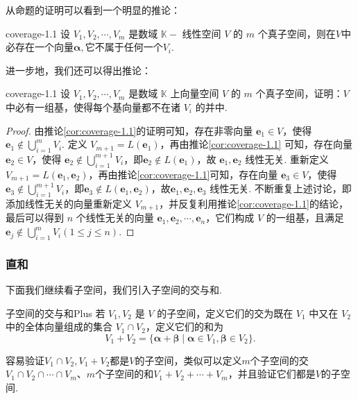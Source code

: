 \documentclass[12pt, a4paper,newtx]{ctexart}
\begin{document}
从命题的证明可以看到一个明显的推论：
\begin{corollary}{}{coverage-1.1}
	设 $V_1, V_2, \cdots, V_m$ 是数域 $\mathbb{K}-$ 线性空间 $V$ 的 $m$ 个真子空间，则在$V$中必存在一个向量$\bm\alpha,$它不属于任何一个$V_i.$
\end{corollary}
进一步地，我们还可以得出推论：\begin{corollary}{}{coverage-1.1}
	设 $V_1, V_2, \cdots, V_m$ 是数域 $\mathbb{K}$ 上向量空间 $V$ 的 $m$ 个真子空间，证明：$V$ 中必有一组基，使得每个基向量都不在诸 $V_i$ 的并中. 
\end{corollary}
\begin{proof}
	由推论\ref{cor:coverage-1.1}的证明可知，存在非零向量 $\bm e_1 \in V$，使得 $\displaystyle \bm e_1 \notin \bigcup_{i=1}^{m} V_i$. 定义 $V_{m+1} = L(\bm e_1)$，再由推论\ref{cor:coverage-1.1} 可知，存在向量 $\bm e_2 \in V$，使得 $\displaystyle \bm e_2 \notin \bigcup_{i=1}^{m+1} V_i$，即$\bm e_2 \notin L(\bm e_1)$，故 $\bm e_1, \bm e_2$ 线性无关. 重新定义 $V_{m+1} = L(\bm e_1, \bm e_2)$，再由推论\ref{cor:coverage-1.1}可知，存在向量 $\bm e_3 \in V$，使得 $\displaystyle \bm e_3 \notin \bigcup_{i=1}^{m+1} V_i$，即$\bm e_3 \notin L(\bm e_1, \bm e_2)$，故$\bm e_1, \bm e_2, \bm e_3$ 线性无关. 不断重复上述讨论，即添加线性无关的向量重新定义 $V_{m+1}$，并反复利用推论\ref{cor:coverage-1.1}的结论，最后可以得到 $n$ 个线性无关的向量 $\bm e_1, \bm e_2, \cdots, \bm e_n$，它们构成 $V$ 的一组基，且满足 $\displaystyle \bm e_j \notin \bigcup_{i=1}^{m} V_i (1 \leqslant j \leqslant n)$. 
\end{proof}
\subsubsection{直和}
下面我们继续看子空间，我们引入子空间的交与和. 
\begin{definition}{子空间的交与和}{Plus}\kaishu 
	若 $ V_1, V_2 $ 是 $ V $ 的子空间，定义它们的交为既在 $ V_1 $ 中又在 $ V_2 $ 中的全体向量组成的集合 $ V_1 \cap V_2 $，定义它们的和为
	\[
	V_1 + V_2 = \{\bm\alpha + \bm\beta \mid \bm\alpha \in V_1, \bm\beta \in V_2\}.
	\]
\end{definition}
容易验证$V_1\cap V_2,V_1+V_2$都是$V$的子空间，类似可以定义$m$个子空间的交$V_1\cap V_2\cap\cdots\cap V_m$、$m$个子空间的和$V_1+V_2+\cdots+V_m$，并且验证它们都是$V$的子空间. 
\end{document}
